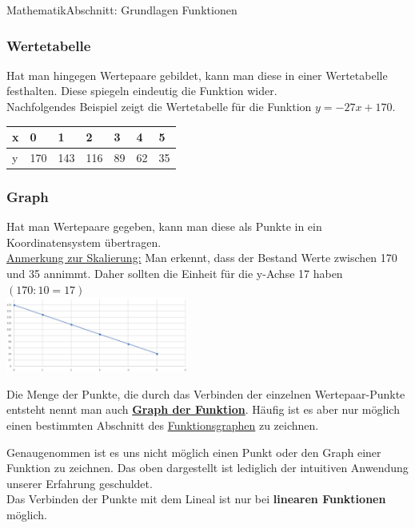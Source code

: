 \documentclass[11pt,twocolumn,oneside,openany,headings=optiontotoc,11pt,numbers=noenddot]{article}
\begin{document}
\begin{worksheet}{}{Mathematik}{Abschnitt: Grundlagen Funktionen}
		\subsubsection*{Wertetabelle}
		Hat man hingegen Wertepaare gebildet, kann man diese in einer Wertetabelle festhalten. Diese spiegeln eindeutig die Funktion wider.\\
		Nachfolgendes Beispiel zeigt die Wertetabelle für die Funktion \(y = -27x+170\).\\
		\par\bigskip\noindent
		\begin{tabularx}{0.5\textwidth}{|l|X|X|X|X|X|X|}
			\hline
			x & 0 & 1 & 2 & 3 & 4 & 5\\
			\hline
			y & 170 & 143 & 116 & 89 & 62 & 35\\
			\hline
		\end{tabularx}
		\subsubsection*{Graph}
		Hat man Wertepaare gegeben, kann man diese als Punkte in ein Koordinatensystem übertragen.\\
		\underline{Anmerkung zur Skalierung:} Man erkennt, dass der Bestand Werte zwischen 170 und 35 annimmt. Daher sollten die Einheit für die y-Achse 17 haben \((170:10 = 17)\)\\
		\includegraphics[width=0.45\textwidth]{../99_Bilder/bierkoord.jpg}\\
		\par\bigskip\noindent
		Die Menge der Punkte, die durch das Verbinden der einzelnen Wertepaar-Punkte entsteht nennt man auch \underline{\textbf{Graph der Funktion}}. Häufig ist es aber nur möglich einen bestimmten Abschnitt des \underline{Funktionsgraphen} zu zeichnen.\\
		\par\bigskip\noindent
		Genaugenommen ist es uns nicht möglich einen Punkt oder den Graph einer Funktion zu zeichnen. Das oben dargestellt ist lediglich der intuitiven Anwendung unserer Erfahrung geschuldet.\\
		Das Verbinden der Punkte mit dem Lineal ist nur bei \textbf{linearen Funktionen} möglich.\\
		\textit{\color{red}{Im Allgemeinen gilt: Das Verwenden des Lineals zum Verbinden der Punkte ist streng verboten!}}\\

\end{worksheet}
\end{document}
